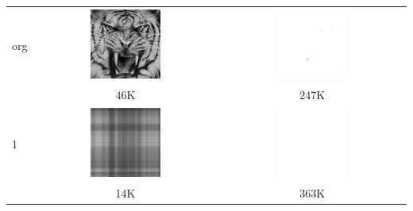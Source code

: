 \begin{center}
\begin{longtable}{|l|c|c|}
        \hline
        org & \includegraphics[width=0.4\textwidth]{photos/photo_org.jpg} & \includegraphics[width=0.4\textwidth]{photos/photo_org.png} \\
        & 46K & 247K \\
        \hline
        1 & \includegraphics[width=0.4\textwidth]{photos/photo_1.jpg} & \includegraphics[width=0.4\textwidth]{photos/photo_1.png} \\
        & 14K & 363K \\

\end{longtable}
\end{center}
